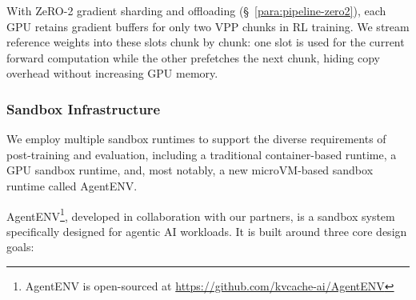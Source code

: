 With ZeRO-2 gradient sharding and offloading (\S~\ref{para:pipeline-zero2}), each GPU retains gradient buffers for only two VPP chunks in  RL training.
We stream reference weights into these slots chunk by chunk: one slot is used for the current forward computation while the other prefetches the next chunk, hiding copy overhead without increasing GPU memory.

\subsubsection{Sandbox Infrastructure}
\label{sec:sandbox}

We employ multiple sandbox runtimes to support the diverse requirements of  post-training and evaluation, including a traditional container-based runtime, a GPU sandbox runtime, and, most notably, a new microVM-based sandbox runtime called AgentENV.

AgentENV\footnote{AgentENV is open-sourced at \url{https://github.com/kvcache-ai/AgentENV}}, developed in collaboration with our partners, is a sandbox system specifically designed for agentic AI workloads.
It is built around three core design goals:

